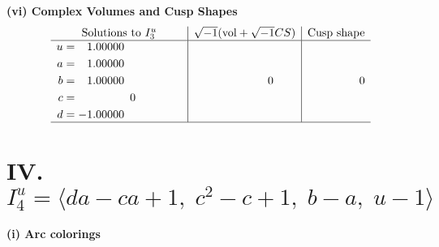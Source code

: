 \documentclass[1p]{elsarticle_modified}
\theoremstyle{definition}
\newcommand{\I}{\sqrt{-1}}
\begin{document}
\newpage\flushleft \textbf{(vi) Complex Volumes and Cusp Shapes}
$$\begin{array}{c|c|c}  
\text{Solutions to }I^u_{3}& \I (\text{vol} + \sqrt{-1}CS) & \text{Cusp shape}\\
 \hline 
\begin{aligned}
u &= \phantom{-}1.00000\phantom{ +0.000000I} \\
a &= \phantom{-}1.00000\phantom{ +0.000000I} \\
b &= \phantom{-}1.00000\phantom{ +0.000000I} \\
c &= \phantom{-0.000000 } 0 \\
d &= -1.00000\phantom{ +0.000000I}\end{aligned}
 & \phantom{-0.000000 } 0 & \phantom{-0.000000 } 0\\
 \hline 
 \end{array}$$\newpage\newpage\renewcommand{\arraystretch}{1}
\centering \section*{IV. $I^u_{4}= \langle d a- c a+1,\;c^2- c+1,\;b- a,\;u-1 \rangle$}
\flushleft \textbf{(i) Arc colorings}\\
\end{document}
